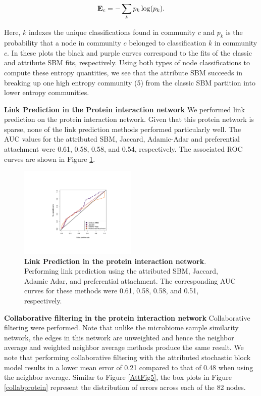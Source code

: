 \begin{equation}
{\bf E}_{c}=-\sum_{k} p_{k}\log(p_{k}).
\end{equation}

Here, $k$ indexes the unique classifications found in community $c$ and $p_{k}$ is the probability that a node in community $c$ belonged to classification $k$ in community $c$. In these plots the black and purple curves correspond to the fits of the classic and attribute SBM fits, respectively. Using both types of node classifications to compute these entropy quantities, we see that the attribute SBM succeeds in breaking up one high entropy community (5) from the classic SBM partition into lower entropy communities. 

{\bf Link Prediction in the Protein interaction network}
We performed link prediction on the protein interaction network. Given that this protein network is sparse, none of the link prediction methods performed particularly well. The AUC values for the attributed SBM, Jaccard, Adamic-Adar and preferential attachment were 0.61, 0.58, 0.58, and 0.54, respectively. The associated ROC curves are shown in Figure \ref{AttFig9}.  

\begin{figure}[h!]
\begin{center}
\includegraphics[width=0.5\textwidth]{ROC_Protein.pdf}
\caption{{\bf Link Prediction in the protein interaction network}. Performing link prediction using the attributed SBM, Jaccard, Adamic Adar, and preferential attachment. The corresponding AUC curves for these methods were 0.61, 0.58, 0.58, and 0.51, respectively.}
\label{AttFig9}
\end{center}
\end{figure}
{\bf Collaborative filtering in the protein interaction network}
Collaborative filtering were performed. Note that unlike the microbiome sample similarity network, the edges in this network are unweighted and hence the neighbor average and weighted neighbor average methods produce the same result. We note that performing collaborative filtering with the attributed stochastic block model results in a lower mean error of 0.21 compared to that of 0.48 when using the neighbor average. Similar to Figure \ref{AttFig5}, the box plots in Figure \ref{collabprotein} represent the distribution of errors across each of the 82 nodes.

